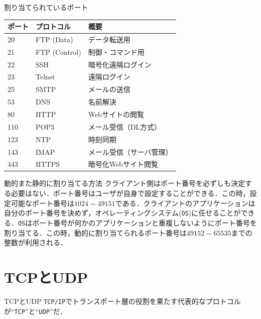\documentclass[unicode,11pt,aspectratio=169]{beamer}
\begin{document}
\begin{frame}{割り当てられているポート}
  \footnotesize 
  \begin{table}
    \begin{tabular}{l l p{3.5cm}} %
        \hline
        \textbf{ポート} & \textbf{プロトコル} & \textbf{概要} \\
        \hline
        20 & FTP (Data) & データ転送用 \\
        21 & FTP (Control)& 制御・コマンド用 \\
        22 & SSH & 暗号化遠隔ログイン \\
        23 & Telnet & 遠隔ログイン \\
        25 & SMTP & メールの送信 \\
        53 & DNS & 名前解決 \\
        80 & HTTP & Webサイトの閲覧 \\
        110 & POP3 & メール受信（DL方式） \\
        123 & NTP & 時刻同期 \\
        143 & IMAP & メール受信（サーバ管理） \\
        443 & HTTPS & 暗号化Webサイト閲覧 \\
        \hline
    \end{tabular}
  \end{table}
\end{frame}

\begin{frame}{動的また静的に割り当てる方法}
  クライアント側はポート番号を必ずしも決定する必要はない．ポート番号はユーザが自身で設定することができる．この時，設定可能なポート番号は$1024 \sim 49151$である．クライアントのアプリケーションは自分のポート番号を決めず，オペレーティングシステム(\texttt{OS})に任せることができる．\texttt{OS}はポート番号が何かのアプリケーションと重複しないようにポート番号を割り当てる．この時，動的に割り当てられるポート番号は$49152 \sim 65535$までの整数が利用される．
\end{frame}
\section{TCPとUDP}

\begin{frame}{TCPとUDP}
  \texttt{TCP/IP}でトランスポート層の役割を果たす代表的なプロトコルが``\texttt{TCP}''と``\texttt{UDP}''だ．
\end{frame}
\end{document}
